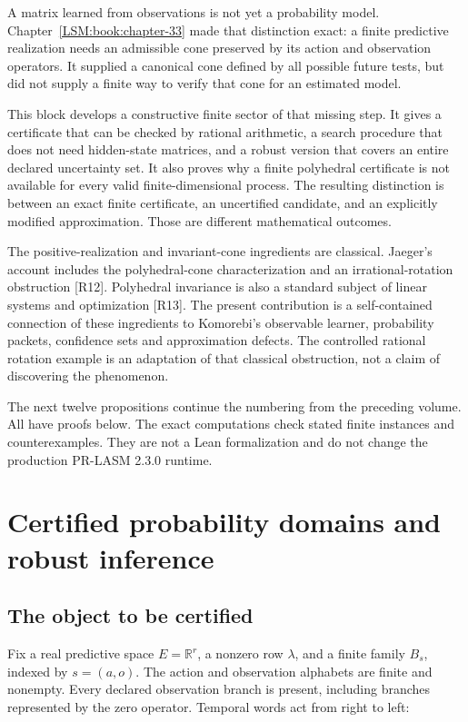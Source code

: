 \label{LSM:part-iv.-certified-probability-domains-and-robust-learning}

A matrix learned from observations is not yet a probability model. Chapter~\ref{LSM:book:chapter-33} made that distinction exact: a finite predictive realization needs
an admissible cone preserved by its action and observation operators. It
supplied a canonical cone defined by all possible future tests, but did
not supply a finite way to verify that cone for an estimated model.

This block develops a constructive finite sector of that missing step.
It gives a certificate that can be checked by rational arithmetic, a
search procedure that does not need hidden-state matrices, and a robust
version that covers an entire declared uncertainty set. It also proves
why a finite polyhedral certificate is not available for every valid
finite-dimensional process. The resulting distinction is between an
exact finite certificate, an uncertified candidate, and an explicitly
modified approximation. Those are different mathematical outcomes.

The positive-realization and invariant-cone ingredients are classical.
Jaeger's account includes the polyhedral-cone characterization and an
irrational-rotation obstruction {[}R12{]}. Polyhedral invariance is also
a standard subject of linear systems and optimization {[}R13{]}. The
present contribution is a self-contained connection of these ingredients
to Komorebi's observable learner, probability packets, confidence sets
and approximation defects. The controlled rational rotation example is
an adaptation of that classical obstruction, not a claim of discovering
the phenomenon.

The next twelve propositions continue the numbering from the preceding
volume. All have proofs below. The exact computations check stated
finite instances and counterexamples. They are not a Lean formalization
and do not change the production PR-LASM 2.3.0 runtime.


\chapter{Certified probability domains and robust inference}\label{LSM:book:chapter-34}
\section{The object to be certified}\label{LSM:the-object-to-be-certified}

Fix a real predictive space \(E=\mathbb R^r\), a nonzero row
\(\lambda\), and a finite family \(B_s\), indexed by \(s=(a,o)\). The
action and observation alphabets are finite and nonempty. Every declared
observation branch is present, including branches represented by the
zero operator. Temporal words act from right to left:

